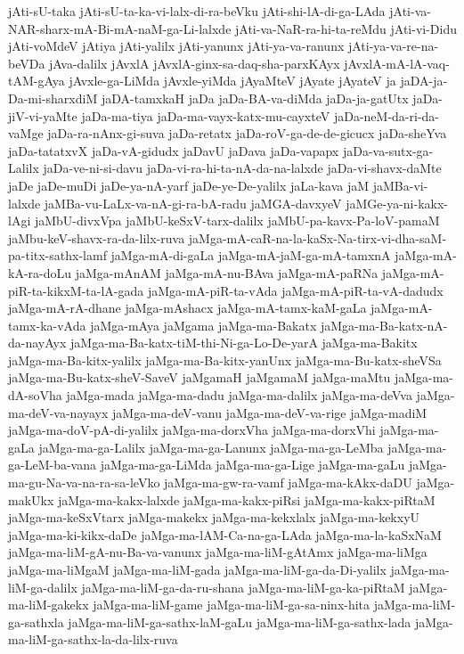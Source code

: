 {jAti-sU-taka
jAti-sU-ta-ka-vi-lalx-di-ra-beVku
jAti-shi-lA-di-ga-LAda
jAti-va-NAR-sharx-mA-Bi-mA-naM-ga-Li-lalxde
jAti-va-NaR-ra-hi-ta-reMdu
jAti-vi-Didu
jAti-voMdeV
jAtiya
jAti-yalilx
jAti-yanunx
jAti-ya-va-ranunx
jAti-ya-va-re-na-beVDa
jAva-dalilx
jAvxlA
jAvxlA-ginx-sa-daq-sha-parxKAyx
jAvxlA-mA-lA-vaq-tAM-gAya
jAvxle-ga-LiMda
jAvxle-yiMda
jAyaMteV
jAyate
jAyateV
ja
jaDA-ja-Da-mi-sharxdiM
jaDA-tamxkaH
jaDa
jaDa-BA-va-diMda
jaDa-ja-gatUtx
jaDa-jiV-vi-yaMte
jaDa-ma-tiya
jaDa-ma-vayx-katx-mu-cayxteV
jaDa-neM-da-ri-da-vaMge
jaDa-ra-nAnx-gi-suva
jaDa-retatx
jaDa-roV-ga-de-de-gicucx
jaDa-sheYva
jaDa-tatatxvX
jaDa-vA-gidudx
jaDavU
jaDava
jaDa-vapapx
jaDa-va-sutx-ga-Lalilx
jaDa-ve-ni-si-davu
jaDa-vi-ra-hi-ta-nA-da-na-lalxde
jaDa-vi-shavx-daMte
jaDe
jaDe-muDi
jaDe-ya-nA-yarf
jaDe-ye-De-yalilx
jaLa-kava
jaM
jaMBa-vi-lalxde
jaMBa-vu-LaLx-va-nA-gi-ra-bA-radu
jaMGA-davxyeV
jaMGe-ya-ni-kakx-lAgi
jaMbU-divxVpa
jaMbU-keSxV-tarx-dalilx
jaMbU-pa-kavx-Pa-loV-pamaM
jaMbu-keV-shavx-ra-da-lilx-ruva
jaMga-mA-caR-na-la-kaSx-Na-tirx-vi-dha-saM-pa-titx-sathx-lamf
jaMga-mA-di-gaLa
jaMga-mA-jaM-ga-mA-tamxnA
jaMga-mA-kA-ra-doLu
jaMga-mAnAM
jaMga-mA-nu-BAva
jaMga-mA-paRNa
jaMga-mA-piR-ta-kikxM-ta-lA-gada
jaMga-mA-piR-ta-vAda
jaMga-mA-piR-ta-vA-dadudx
jaMga-mA-rA-dhane
jaMga-mAshacx
jaMga-mA-tamx-kaM-gaLa
jaMga-mA-tamx-ka-vAda
jaMga-mAya
jaMgama
jaMga-ma-Bakatx
jaMga-ma-Ba-katx-nA-da-nayAyx
jaMga-ma-Ba-katx-tiM-thi-Ni-ga-Lo-De-yarA
jaMga-ma-Bakitx
jaMga-ma-Ba-kitx-yalilx
jaMga-ma-Ba-kitx-yanUnx
jaMga-ma-Bu-katx-sheVSa
jaMga-ma-Bu-katx-sheV-SaveV
jaMgamaH
jaMgamaM
jaMga-maMtu
jaMga-ma-dA-soVha
jaMga-mada
jaMga-ma-dadu
jaMga-ma-dalilx
jaMga-ma-deVva
jaMga-ma-deV-va-nayayx
jaMga-ma-deV-vanu
jaMga-ma-deV-va-rige
jaMga-madiM
jaMga-ma-doV-pA-di-yalilx
jaMga-ma-dorxVha
jaMga-ma-dorxVhi
jaMga-ma-gaLa
jaMga-ma-ga-Lalilx
jaMga-ma-ga-Lanunx
jaMga-ma-ga-LeMba
jaMga-ma-ga-LeM-ba-vana
jaMga-ma-ga-LiMda
jaMga-ma-ga-Lige
jaMga-ma-gaLu
jaMga-ma-gu-Na-va-na-ra-sa-leVko
jaMga-ma-gw-ra-vamf
jaMga-ma-kAkx-daDU
jaMga-makUkx
jaMga-ma-kakx-lalxde
jaMga-ma-kakx-piRsi
jaMga-ma-kakx-piRtaM
jaMga-ma-keSxVtarx
jaMga-makekx
jaMga-ma-kekxlalx
jaMga-ma-kekxyU
jaMga-ma-ki-kikx-daDe
jaMga-ma-lAM-Ca-na-ga-LAda
jaMga-ma-la-kaSxNaM
jaMga-ma-liM-gA-nu-Ba-va-vanunx
jaMga-ma-liM-gAtAmx
jaMga-ma-liMga
jaMga-ma-liMgaM
jaMga-ma-liM-gada
jaMga-ma-liM-ga-da-Di-yalilx
jaMga-ma-liM-ga-dalilx
jaMga-ma-liM-ga-da-ru-shana
jaMga-ma-liM-ga-ka-piRtaM
jaMga-ma-liM-gakekx
jaMga-ma-liM-game
jaMga-ma-liM-ga-sa-ninx-hita
jaMga-ma-liM-ga-sathxla
jaMga-ma-liM-ga-sathx-laM-gaLu
jaMga-ma-liM-ga-sathx-lada
jaMga-ma-liM-ga-sathx-la-da-lilx-ruva
}
